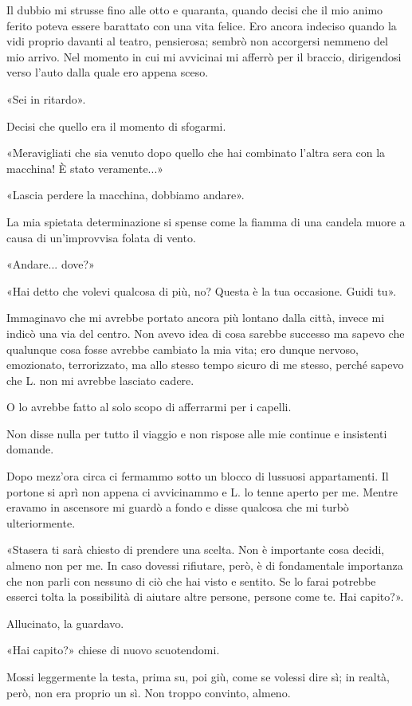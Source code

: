 \documentclass[a4paper,11pt,oneside,openright,final]{memoir}
\begin{document}
Il dubbio mi strusse fino alle otto e quaranta, quando decisi che il mio animo
ferito poteva essere barattato con una vita felice. Ero ancora indeciso quando
la vidi proprio davanti al teatro, pensierosa; sembrò non accorgersi nemmeno
del mio arrivo. Nel momento in cui mi avvicinai mi afferrò per il braccio,
dirigendosi verso l'auto dalla quale ero appena sceso.

«Sei in ritardo».

Decisi che quello era il momento di sfogarmi.

«Meravigliati che sia venuto dopo quello che hai combinato l'altra sera con
la macchina! È stato veramente...»

«Lascia perdere la macchina, dobbiamo andare».

La mia spietata determinazione si spense come la fiamma di una candela muore a
causa di un'improvvisa folata di vento.

«Andare... dove?»

«Hai detto che volevi qualcosa di più, no? Questa è la tua occasione. Guidi tu».

Immaginavo che mi avrebbe portato ancora più lontano dalla città, invece mi
indicò una via del centro. Non avevo idea di cosa sarebbe successo ma sapevo
che qualunque cosa fosse avrebbe cambiato la mia vita; ero dunque nervoso,
emozionato, terrorizzato, ma allo stesso tempo sicuro di me stesso, perché
sapevo che L. non mi avrebbe lasciato cadere.

O lo avrebbe fatto al solo scopo di afferrarmi per i capelli.

Non disse nulla per tutto il viaggio e non rispose alle mie continue e
insistenti domande.

Dopo mezz'ora circa ci fermammo sotto un blocco di lussuosi appartamenti. Il
portone si aprì non appena ci avvicinammo e L. lo tenne aperto per me. Mentre
eravamo in ascensore mi guardò a fondo e disse qualcosa che mi turbò
ulteriormente.

«Stasera ti sarà chiesto di prendere una scelta. Non è importante cosa
decidi, almeno non per me. In caso dovessi rifiutare, però, è di fondamentale
importanza che non parli con nessuno di ciò che hai visto e sentito. Se lo farai
potrebbe esserci tolta la possibilità di aiutare altre persone, persone come te.
Hai capito?».

Allucinato, la guardavo.

«Hai capito?» chiese di nuovo scuotendomi.

Mossi leggermente la testa, prima su, poi giù, come se volessi dire sì; in
realtà, però, non era proprio un sì. Non troppo convinto, almeno.
\end{document}

